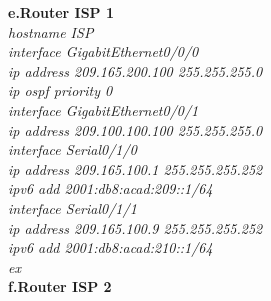 \documentclass[a4paper, 12pt]{article}
\begin{document}
\hspace*{1cm}\textbf{e.Router ISP 1} \\
\hspace*{2cm}\textit{hostname ISP\\
\hspace*{2cm}interface GigabitEthernet0/0/0\\
\hspace*{2cm}ip address 209.165.200.100 255.255.255.0\\
\hspace*{2cm}ip ospf priority 0\\
\hspace*{2cm}interface GigabitEthernet0/0/1\\
\hspace*{2cm}ip address 209.100.100.100 255.255.255.0\\
\hspace*{2cm}interface Serial0/1/0\\
\hspace*{2cm}ip address 209.165.100.1 255.255.255.252\\
\hspace*{2cm}ipv6 add 2001:db8:acad:209::1/64\\
\hspace*{2cm}interface Serial0/1/1\\
\hspace*{2cm}ip address 209.165.100.9 255.255.255.252\\
\hspace*{2cm}ipv6 add 2001:db8:acad:210::1/64\\
\hspace*{2cm}ex\\}
\hspace*{1cm}\textbf{f.Router ISP 2} \\
\end{document}
